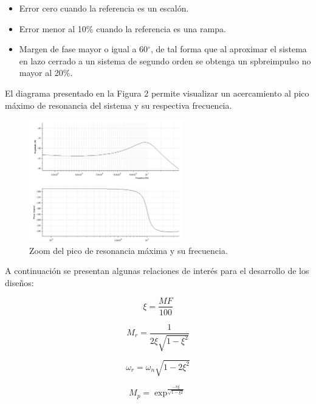\documentclass[12pt,letterpaper]{article}
\begin{document}
\begin{itemize}
    \item Error cero cuando la referencia es un escalón.
    \item Error menor al 10$\%$ cuando la referencia es una rampa.
    \item Margen de fase mayor o igual a 60$^\circ$, de tal forma que al aproximar el sistema en lazo cerrado a un sistema de segundo orden se obtenga un spbreimpulso no mayor al 20$\%$.
\end{itemize}

El diagrama presentado en la Figura 2 permite visualizar un acercamiento al pico máximo de resonancia del sistema y su respectiva frecuencia.\\

\begin{figure}
  \centering
    \includegraphics[width=0.6\textwidth]{Fig2.jpg}
  \caption{Zoom del pico de resonancia máxima y su frecuencia.}
  \label{fig:ejemplo}
\end{figure}


A continuación se presentan algunas relaciones de interés para el desarrollo de los diseños:

\begin{equation}
    \xi = \frac{MF}{100}
\end{equation}

\begin{equation}
    M_r = \frac{1}{2\xi\sqrt{1-\xi^2}}
\end{equation}

\begin{equation}
    \omega_r = \omega_n \sqrt{1-2\xi^2}
\end{equation}

\begin{equation}
    M_p = \exp^\frac{-\pi\xi}{\sqrt{1-\xi2}}
\end{equation}
\end{document}
